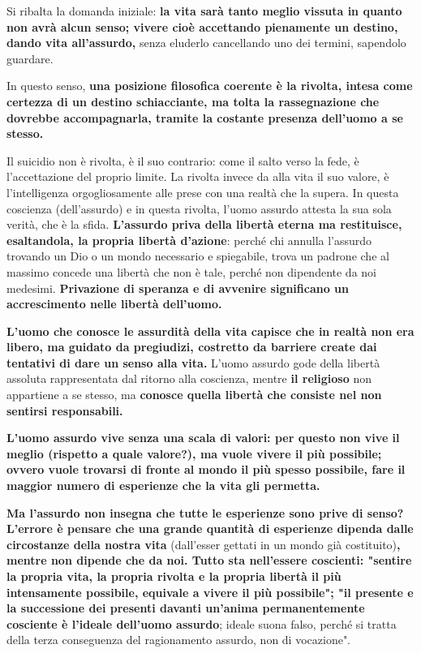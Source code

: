 \documentclass[a4paper,12pt,oneside]{article}%
\begin{document}
Si ribalta la domanda iniziale: \textbf{la vita sarà tanto meglio vissuta in quanto non avrà alcun senso; vivere cioè accettando pienamente un destino, dando vita all'assurdo,} senza eluderlo cancellando uno dei termini, sapendolo guardare.

In questo senso, \textbf{una posizione filosofica coerente è la rivolta, intesa come certezza di un destino schiacciante, ma tolta la rassegnazione che dovrebbe accompagnarla, tramite la costante presenza dell'uomo a se stesso.}

Il suicidio non è rivolta, è il suo contrario: come il
salto verso la fede, è l'accettazione del proprio
limite.
La rivolta invece da alla vita il suo valore, è
l'intelligenza orgogliosamente alle prese con una realtà che la
supera. In questa coscienza (dell'assurdo) e in questa rivolta, l'uomo assurdo
attesta la sua sola verità, che è la sfida.
\textbf{L'assurdo priva della libertà eterna ma restituisce,
esaltandola, la propria libertà d'azione}: perché chi
annulla l'assurdo trovando un Dio o un mondo
necessario e spiegabile, trova un padrone che al
massimo concede una libertà che non è tale,
perché non dipendente da noi medesimi.
\textbf{Privazione di speranza e di avvenire significano un
accrescimento nelle libertà dell'uomo.}

\textbf{L'uomo che
conosce le assurdità della vita capisce che
in realtà non era libero, ma guidato da pregiudizi, costretto da barriere create dai tentativi di dare
un senso alla vita.}
L'uomo assurdo gode della libertà assoluta
rappresentata dal ritorno alla coscienza, mentre \textbf{il
religioso} non appartiene a se stesso, ma \textbf{conosce
quella libertà che consiste nel non sentirsi
responsabili.}

\textbf{L'uomo assurdo vive senza una scala di
valori: per questo non vive il meglio (rispetto a
quale valore?), ma vuole vivere il più
possibile; ovvero vuole trovarsi di fronte al
mondo il più spesso possibile, fare il maggior
numero di esperienze che la vita gli permetta.}

\textbf{Ma l'assurdo non insegna che tutte le esperienze
sono prive di senso?
L'errore è pensare che una grande quantità di
esperienze dipenda dalle circostanze della
nostra vita} (dall'esser gettati in un mondo già
costituito)\textbf{, mentre non dipende che da noi.
Tutto sta nell'essere coscienti: "sentire la propria
vita, la propria rivolta e la propria libertà il
più intensamente possibile, equivale a vivere il
più possibile"; "il presente e la successione
dei presenti davanti un'anima permanentemente
cosciente è l'ideale dell'uomo assurdo};
ideale suona falso, perché si tratta della terza
conseguenza del ragionamento assurdo, non di
vocazione".
\end{document}
